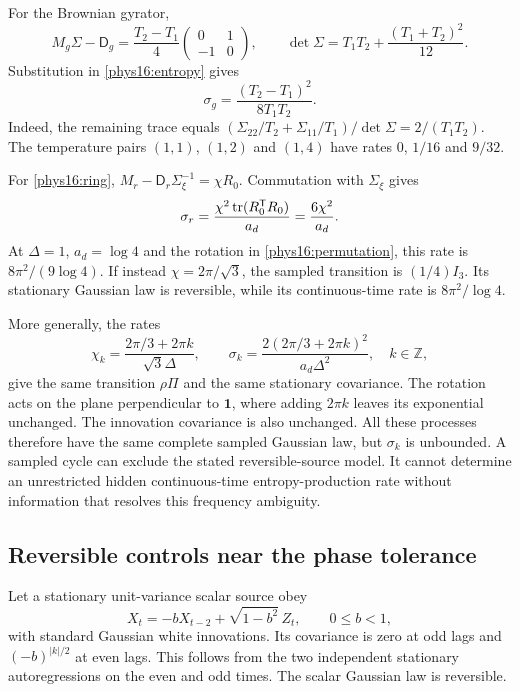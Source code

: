 For the Brownian gyrator,
\[
 M_g\Sigma-\mathsf D_g=\frac{T_2-T_1}{4}
 \begin{pmatrix}0&1\\-1&0\end{pmatrix},
 \qquad
 \det\Sigma=T_1T_2+\frac{(T_1+T_2)^2}{12}.
\]
Substitution in \eqref{phys16:entropy} gives
\begin{equation}
 \sigma_g=\frac{(T_2-T_1)^2}{8T_1T_2}.
 \label{phys16:gyrator-entropy}
\end{equation}
Indeed, the remaining trace equals
$(\Sigma_{22}/T_2+\Sigma_{11}/T_1)/\det\Sigma=2/(T_1T_2)$. The temperature pairs $(1,1)$, $(1,2)$ and $(1,4)$ have rates $0$, $1/16$ and $9/32$.

For \eqref{phys16:ring}, $M_r-\mathsf D_r\Sigma_\xi^{-1}=\chi R_0$. Commutation with $\Sigma_\xi$ gives
\begin{equation}
 \sigma_r=\frac{\chi^2\operatorname{tr}(R_0^{\mathsf T}R_0)}{a_d}
          =\frac{6\chi^2}{a_d}.
 \label{phys16:ring-entropy}
\end{equation}
At $\Delta=1$, $a_d=\log4$ and the rotation in \eqref{phys16:permutation}, this rate is $8\pi^2/(9\log4)$. If instead $\chi=2\pi/\sqrt3$, the sampled transition is $(1/4)I_3$. Its stationary Gaussian law is reversible, while its continuous-time rate is $8\pi^2/\log4$.

More generally, the rates
\begin{equation}
 \chi_k=\frac{2\pi/3+2\pi k}{\sqrt3\Delta},
 \qquad
 \sigma_k=\frac{2(2\pi/3+2\pi k)^2}{a_d\Delta^2},
 \quad k\in\mathbb Z,
 \label{phys16:aliases}
\end{equation}
give the same transition $\rho\Pi$ and the same stationary covariance. The rotation acts on the plane perpendicular to $\mathbf1$, where adding $2\pi k$ leaves its exponential unchanged. The innovation covariance is also unchanged. All these processes therefore have the same complete sampled Gaussian law, but $\sigma_k$ is unbounded. A sampled cycle can exclude the stated reversible-source model. It cannot determine an unrestricted hidden continuous-time entropy-production rate without information that resolves this frequency ambiguity.

\subsection{Reversible controls near the phase tolerance}

Let a stationary unit-variance scalar source obey
\[
 X_t=-bX_{t-2}+\sqrt{1-b^2}\,Z_t,\qquad 0\le b<1,
\]
with standard Gaussian white innovations. Its covariance is zero at odd lags and $(-b)^{|k|/2}$ at even lags. This follows from the two independent stationary autoregressions on the even and odd times. The scalar Gaussian law is reversible.

